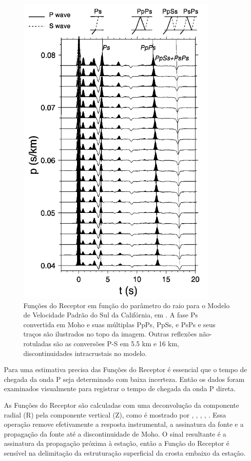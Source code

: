 \begin{figure}[!ht]
\centering
\includegraphics[scale=0.8]{Figs/funcoes_sinteticas.png}
\caption[Funções do Receptor sintéticas em função do parâmetro do raio para o Modelo de Velocidade Padrão do Sul da Califórnia.]{Funções do Receptor em função do parâmetro do raio para o Modelo de Velocidade Padrão do Sul da Califórnia, em \cite{Zhu_Kanamori_2000}. A fase Ps convertida em Moho e suas múltiplas  PpPs, PpSs, e PsPs e seus traços são ilustrados no topo da imagem. Outras reflexões não-rotuladas são as conversões P-S em 5.5 km e 16 km, discontinuidades intracrustais no modelo.}
\label{funcoes_sinteticas}
\end{figure}

Para uma estimativa precisa das Funções do Receptor é essencial que o tempo de chegada da onda P seja determinado com baixa incerteza. Então os dados foram examinados visualmente para registrar o tempo de chegada da onda P direta. 

As Funções do Receptor são calculadas com uma deconvolução da componente radial (R) pela componente vertical (Z), como é mostrado por \cite{clayton_source_1976}, \cite{Langston_1977}, \cite{ammon_isolation_1991}, \cite{cassidy_numerical_1992}, \cite{Zhu_Kanamori_2000}. Essa operação remove efetivamente a resposta instrumental, a assinatura da fonte e a propagação da fonte até a discontinuidade de Moho. O sinal resultante é a assinatura da propagação próxima à estação, então a Função do Receptor é sensível na delimitação da estruturação superficial da crosta embaixo da estação.

